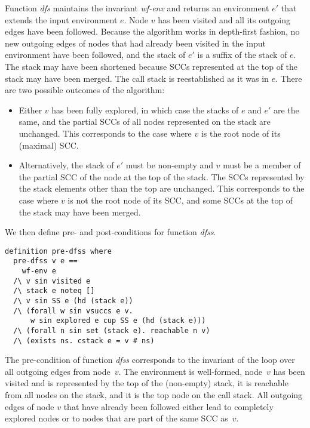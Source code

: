\documentclass[sigplan,10pt,anonymous,review]{acmart}
\newcommand{\prog}[1]{\textit{#1}}
\begin{document}
Function \prog{dfs} maintains the invariant \prog{wf-env} and returns an environment $e'$ that extends the input environment $e$. Node $v$ has been visited and all its outgoing edges have been followed. Because the algorithm works in depth-first fashion, no new outgoing edges of nodes that had already been visited in the input environment have been followed, and the stack of $e'$ is a suffix of the stack of $e$.
The stack may have been shortened because SCCs represented at the top of the stack may have been merged. The call stack is reestablished as it was in $e$. There are two possible outcomes of the algorithm:
\begin{itemize}
\item Either $v$ has been fully explored, in which case the stacks of $e$ and $e'$ are the same, and the partial SCCs of all nodes represented on the stack are unchanged. This corresponds to the case where $v$ is the root node of its (maximal) SCC.
\item Alternatively, the stack of $e'$ must be non-empty and $v$ must be a member of the partial SCC of the node at the top of the stack. The SCCs represented by the stack elements other than the top are unchanged. This corresponds to the case where $v$ is not the root node of its SCC, and some SCCs at the top of the stack may have been merged.
\end{itemize}

We then define pre- and post-conditions for function \prog{dfss}.

\begin{small}
\begin{lstlisting}[language=isabelle]
definition pre-dfss where 
  pre-dfss v e ==
    wf-env e 
  /\ v sin visited e
  /\ stack e noteq []
  /\ v sin SS e (hd (stack e))
  /\ (forall w sin vsuccs e v.
      w sin explored e cup SS e (hd (stack e)))
  /\ (forall n sin set (stack e). reachable n v)
  /\ (exists ns. cstack e = v # ns)
\end{lstlisting}
\end{small}

The pre-condition of function \prog{dfss} corresponds to the invariant of the loop over all outgoing edges from node~$v$. The environment is well-formed, node~$v$ has been visited and is represented by the top of the (non-empty) stack, it is reachable from all nodes on the stack, and it is the top node on the call stack. All outgoing edges of node $v$ that have already been followed either lead to completely explored nodes or to nodes that are part of the same SCC as~$v$.
\end{document}
